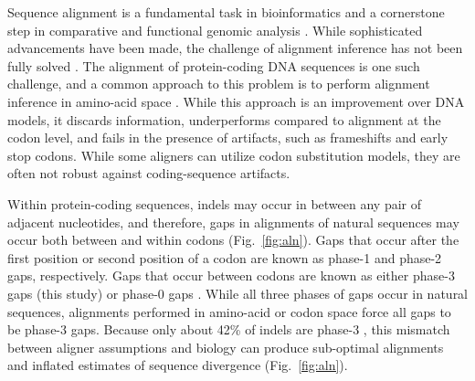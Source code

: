 \documentclass[12pt,letterpaper]{article}
\begin{document}
Sequence alignment is a fundamental task in bioinformatics and a cornerstone step in comparative and functional genomic analysis \citep{sequence_alignment_rosenberg_2009}. While sophisticated advancements have been made, the challenge of alignment inference has not been fully solved \citep{art_morrison_2015}.
%
The alignment of protein-coding DNA sequences is one such challenge, and a common approach to this problem is to perform alignment inference in amino-acid space \citep[e.g.][]{bininda2005transalign,abascal2010translatorx}. While this approach is an improvement over DNA models, it discards information, underperforms compared to alignment at the codon level, and fails in the presence of artifacts, such as frameshifts and early stop codons. While some aligners can utilize codon substitution models, they are often not robust against coding-sequence artifacts.

Within protein-coding sequences, indels may occur in between any pair of adjacent nucleotides, and therefore, gaps in alignments of natural sequences may occur both between and within codons (Fig.\ \ref{fig:aln}). Gaps that occur after the first position or second position of a codon are known as phase-1 and phase-2 gaps, respectively. Gaps that occur between codons are known as either phase-3 gaps (this study) or phase-0 gaps \citep[e.g.][]{taylor2004occurrence}. While all three phases of gaps occur in natural sequences, alignments performed in amino-acid or codon space force all gaps to be phase-3 gaps. Because only about 42\% of indels are phase-3 \citep{taylor2004occurrence, zhu2022profiling}, this mismatch between aligner assumptions and biology can produce sub-optimal alignments and inflated estimates of sequence divergence (Fig.\ \ref{fig:aln}).
\end{document}
